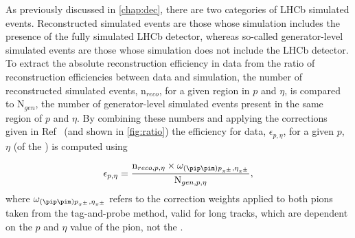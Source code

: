 


As previously discussed in \autoref{chap:dec}, there are two categories of LHCb simulated events. Reconstructed simulated events are those whose simulation includes the presence of the fully simulated LHCb detector, whereas so-called generator-level simulated events are those whose simulation does not include the LHCb detector. %
To extract the absolute reconstruction efficiency in data from the ratio of reconstruction efficiencies between data and simulation, the number of reconstructed simulated events, $\textrm{n}_{reco}$,  for a given region in $p$ and $\eta$, is compared to $\textrm{N}_{gen}$, the number of generator-level simulated events present in the same region of $p$ and $\eta$. By combining these numbers and applying the corrections given in Ref~\cite{LHCB-DP-2013-002} (and shown in \autoref{fig:ratio}) the efficiency for data, $\epsilon_{p,\eta}$, for a given $p$, $\eta$ (of the \KS) is computed using

\begin{equation}
  \epsilon_{p,\eta} = \frac{\textrm{n}_{reco, p, \eta}\times \omega_{(\pip\pim)p_{\pi^{\pm}},\eta_{\pi^{\pm}}}}{\textrm{N}_{gen, p, \eta}},
  \label{eq:dataeff} 
\end{equation}
where $\omega_{(\pip\pim)p_{\pi^{\pm}},\eta_{\pi^{\pm}}}$ refers to the correction weights applied to both pions taken from the \jpsi tag-and-probe method, valid for long tracks, which are dependent on the $p$ and $\eta$ value of the pion, not the \KS. 


